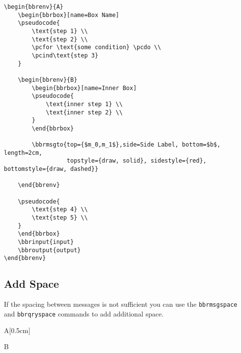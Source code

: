 \documentclass[a4paper]{report}
\begin{document}
\begin{lstlisting}
\begin{bbrenv}{A}
	\begin{bbrbox}[name=Box Name]
	\pseudocode{
		\text{step 1} \\
		\text{step 2} \\
		\pcfor \text{some condition} \pcdo \\
		\pcind\text{step 3} 
	}

	\begin{bbrenv}{B}
		\begin{bbrbox}[name=Inner Box]
		\pseudocode{
			\text{inner step 1} \\
			\text{inner step 2} \\
		}
		\end{bbrbox}
		
		\bbrmsgto{top={$m_0,m_1$},side=Side Label, bottom=$b$, length=2cm,
				  topstyle={draw, solid}, sidestyle={red}, bottomstyle={draw, dashed}}

	\end{bbrenv}

	\pseudocode{
		\text{step 4} \\
		\text{step 5} \\
	}
	\end{bbrbox}
	\bbrinput{input}
	\bbroutput{output}
\end{bbrenv}
\end{lstlisting}


\subsection{Add Space}
If the spacing between messages is not sufficient you can use the \lstinline$bbrmsgspace$ and
\lstinline$bbrqryspace$ commands to add additional space.

\begin{bbrenv}[1cm]{A}[0.5cm]
	\begin{bbrbox}[name=Reduction]

	\begin{bbrenv}{B}

		\begin{bbrbox}[name=Adversary,minheight=3cm,xshift=4cm]

		\end{bbrbox}
		
		\bbrmsgspace{1.5cm}

		\bbrqryspace{1cm}

	\end{bbrenv}

	\end{bbrbox}
\end{bbrenv}
\end{document}
